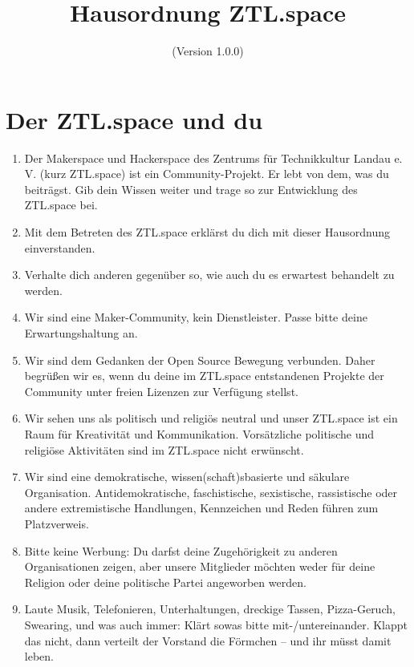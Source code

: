 \documentclass[a4paper, 12pt, numbers=withenddot,]{scrartcl}
\begin{document}
\title{Hausordnung ZTL.space}
\subtitle{(Version 1.0.0)}
\author{}
\date{}

\maketitle

\section{Der ZTL.space und du}
\begin{enumerate}[label=\alph*)]
	\item Der Makerspace und Hackerspace des Zentrums für Technikkultur Landau e. V.
(kurz ZTL.space) ist ein Community-Projekt. Er lebt von dem, was du beiträgst.
Gib dein Wissen weiter und trage so zur Entwicklung des ZTL.space bei.
	\item  Mit dem Betreten des ZTL.space erklärst du dich mit dieser Hausordnung
einverstanden.
	\item Verhalte dich anderen gegenüber so, wie auch du es erwartest behandelt zu
werden.
	\item Wir sind eine Maker-Community, kein Dienstleister. Passe bitte deine
Erwartungshaltung an.
	\item Wir sind dem Gedanken der Open Source Bewegung verbunden. Daher begrüßen
wir es, wenn du deine im ZTL.space entstandenen Projekte der Community unter
freien Lizenzen zur Verfügung stellst.
	\item Wir sehen uns als politisch und religiös neutral und unser ZTL.space ist ein Raum
für Kreativität und Kommunikation. Vorsätzliche politische und religiöse Aktivitäten
sind im ZTL.space nicht erwünscht.
	\item  Wir sind eine demokratische, wissen(schaft)sbasierte und säkulare Organisation.
Antidemokratische, faschistische, sexistische, rassistische oder andere
extremistische Handlungen, Kennzeichen und Reden führen zum Platzverweis.
	\item  Bitte keine Werbung: Du darfst deine Zugehörigkeit zu anderen Organisationen
zeigen, aber unsere Mitglieder möchten weder für deine Religion oder deine
politische Partei angeworben werden.
	\item Laute Musik, Telefonieren, Unterhaltungen, dreckige Tassen, Pizza-Geruch,
Swearing, und was auch immer: Klärt sowas bitte mit-/untereinander. Klappt das
nicht, dann verteilt der Vorstand die Förmchen – und ihr müsst damit leben.
\end{enumerate}
\end{document}
